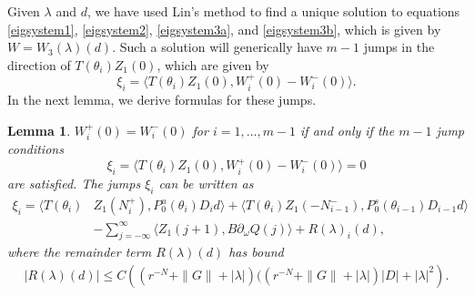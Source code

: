 \documentclass[12pt]{elsarticle}
\newtheorem{lemma}{Lemma}
\begin{document}
Given $\lambda$ and $d$, we have used Lin's method to find a unique solution to equations \cref{eigsystem1}, \cref{eigsystem2}, \cref{eigsystem3a}, and \cref{eigsystem3b}, which is given by $W = W_3(\lambda)(d)$. Such a solution will  generically have $m-1$ jumps in the direction of $T(\theta_i) Z_1(0)$, which are given by
\begin{equation}\label{jumpIP}
\xi_i = \langle T(\theta_i) Z_1(0), W_i^+(0) - W_i^-(0) \rangle.
\end{equation}
In the next lemma, we derive formulas for these jumps.

\begin{lemma}\label{jumpcond}
$W_i^+(0) = W_i^-(0)$ for $i = 1, \dots, m-1$ if and only if the $m-1$ jump conditions
\begin{equation}\label{xicond}
\xi_i = \langle T(\theta_i) Z_1(0), W_i^+(0) - W_i^-(0) \rangle = 0
\end{equation}
are satisfied. The jumps $\xi_i$ can be written as 
\begin{equation}\label{xieq}
\begin{aligned}
\xi_i = \langle T(\theta_i) &Z_1(N_i^+), P_0^u(\theta_i) D_i d \rangle 
+ \langle T(\theta_i) Z_1(-N_{i-1}^-), P_0^s(\theta_{i-1}) D_{i-1} d \rangle \\ 
&- \sum_{j = -\infty}^{\infty} \langle Z_1(j+1), B \partial_\omega Q(j)\rangle + R(\lambda)_i(d),
\end{aligned}
\end{equation}
where the remainder term $R(\lambda)(d)$ has bound
\begin{align}\label{xiRbound}
|R(\lambda)(d)| \leq C\left( (r^{-N} + \|G\| + |\lambda|)( (r^{-N} + \|G\| + |\lambda|)|D| + |\lambda|^2 \right).
\end{align}


\end{lemma}
\end{document}
